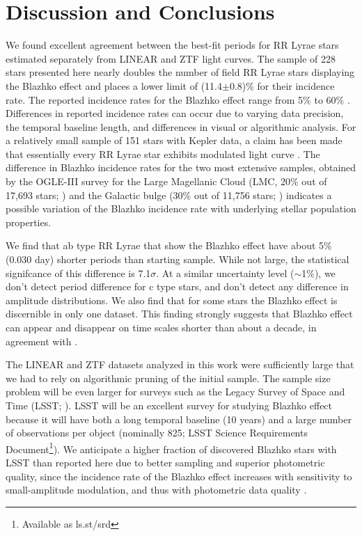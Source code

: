 
\section{Discussion and Conclusions\label{sec:discussion}}

We found excellent agreement
between the best-fit periods for RR Lyrae stars estimated separately from LINEAR and ZTF light curves. 
The sample of 228 stars presented here nearly doubles the number of field RR Lyrae stars displaying the Blazhko
effect and  places a lower limit of (11.4$\pm$0.8)\% for their incidence rate. 
The reported incidence rates for the Blazhko effect
range from 5\% \citep{2007MNRAS.377.1263S} to 60\% \citep{2014A&A...570A.100S}.
Differences in reported incidence rates can occur due to varying data precision, the temporal baseline length, and differences in visual or algorithmic analysis.
For a relatively small sample of
151 stars with Kepler data, a claim has been made that essentially every RR Lyrae star exhibits modulated light curve
\citep{2018A&A...614L...4K}. The difference in Blazhko incidence rates for the two most extensive samples, obtained
by the OGLE-III survey for the Large Magellanic Cloud (LMC, 20\% out of 17,693 stars; \citealt{2009AcA....59....1S})
and the Galactic bulge (30\% out of 11,756 stars; \citealt{2011AcA....61....1S}) indicates a possible variation of
the Blazhko incidence rate with underlying stellar population properties. 
 
We find that ab type RR Lyrae that show the Blazhko effect have about 5\% (0.030 day) shorter periods than starting
sample. While not large, the statistical signifcance of this difference is 7.1$\sigma$. At a similar uncertainty level
($\sim$1\%), we don't detect period difference for c type stars, and don't detect any difference in amplitude distributions.
We also find that for some stars the Blazhko effect is discernible in only one dataset. This finding  strongly suggests that Blazhko effect can
appear and disappear on time scales shorter than about a decade, in agreement with \cite{2009MNRAS.400.1006J}. 

The LINEAR and ZTF datasets analyzed in this work were sufficiently large that we had to rely on algorithmic
pruning of the initial sample. The sample size problem will be even larger for surveys such as the Legacy Survey
of Space and Time (LSST; \citealt{2019ApJ...873..111I}). LSST will be an excellent survey for studying Blazhko effect
\citep{2022ApJS..258....4H} because it will have both a long temporal baseline (10 years) and a large number of
observations per object (nominally 825; LSST Science Requirements Document\footnote{Available as ls.st/srd}).
We anticipate a higher fraction of discovered Blazhko stars with LSST than reported here due to better sampling
and superior photometric quality, since the incidence rate of the Blazhko effect increases with sensitivity to
small-amplitude modulation, and thus with photometric data quality \citep{2009MNRAS.400.1006J}.

